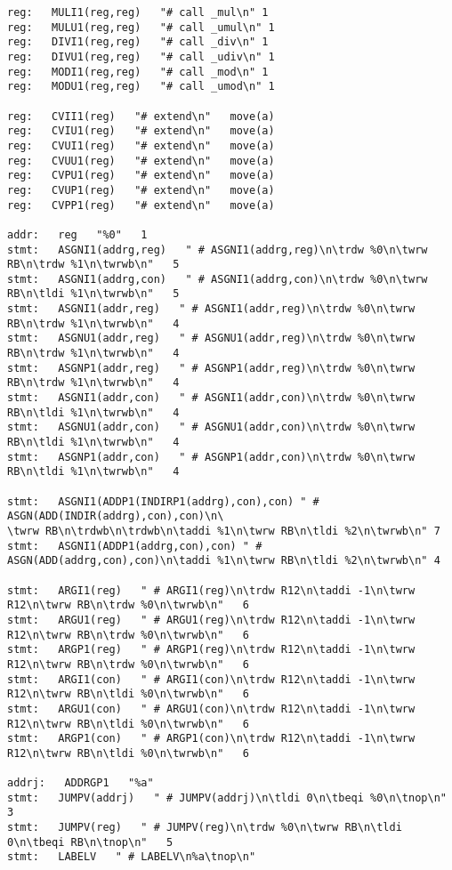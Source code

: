 {\begin{verbatim}
reg:   MULI1(reg,reg)   "# call _mul\n" 1
reg:   MULU1(reg,reg)   "# call _umul\n" 1
reg:   DIVI1(reg,reg)   "# call _div\n" 1
reg:   DIVU1(reg,reg)   "# call _udiv\n" 1
reg:   MODI1(reg,reg)   "# call _mod\n" 1
reg:   MODU1(reg,reg)   "# call _umod\n" 1

reg:   CVII1(reg)   "# extend\n"   move(a)
reg:   CVIU1(reg)   "# extend\n"   move(a)
reg:   CVUI1(reg)   "# extend\n"   move(a)
reg:   CVUU1(reg)   "# extend\n"   move(a)
reg:   CVPU1(reg)   "# extend\n"   move(a)
reg:   CVUP1(reg)   "# extend\n"   move(a)
reg:   CVPP1(reg)   "# extend\n"   move(a)

addr:   reg   "%0"   1
stmt:   ASGNI1(addrg,reg)   " # ASGNI1(addrg,reg)\n\trdw %0\n\twrw RB\n\trdw %1\n\twrwb\n"   5
stmt:   ASGNI1(addrg,con)   " # ASGNI1(addrg,con)\n\trdw %0\n\twrw RB\n\tldi %1\n\twrwb\n"   5
stmt:   ASGNI1(addr,reg)   " # ASGNI1(addr,reg)\n\trdw %0\n\twrw RB\n\trdw %1\n\twrwb\n"   4
stmt:   ASGNU1(addr,reg)   " # ASGNU1(addr,reg)\n\trdw %0\n\twrw RB\n\trdw %1\n\twrwb\n"   4
stmt:   ASGNP1(addr,reg)   " # ASGNP1(addr,reg)\n\trdw %0\n\twrw RB\n\trdw %1\n\twrwb\n"   4
stmt:   ASGNI1(addr,con)   " # ASGNI1(addr,con)\n\trdw %0\n\twrw RB\n\tldi %1\n\twrwb\n"   4
stmt:   ASGNU1(addr,con)   " # ASGNU1(addr,con)\n\trdw %0\n\twrw RB\n\tldi %1\n\twrwb\n"   4
stmt:   ASGNP1(addr,con)   " # ASGNP1(addr,con)\n\trdw %0\n\twrw RB\n\tldi %1\n\twrwb\n"   4

stmt:   ASGNI1(ADDP1(INDIRP1(addrg),con),con) " # ASGN(ADD(INDIR(addrg),con),con)\n\
\twrw RB\n\trdwb\n\trdwb\n\taddi %1\n\twrw RB\n\tldi %2\n\twrwb\n" 7
stmt:   ASGNI1(ADDP1(addrg,con),con) " # ASGN(ADD(addrg,con),con)\n\taddi %1\n\twrw RB\n\tldi %2\n\twrwb\n" 4

stmt:   ARGI1(reg)   " # ARGI1(reg)\n\trdw R12\n\taddi -1\n\twrw R12\n\twrw RB\n\trdw %0\n\twrwb\n"   6
stmt:   ARGU1(reg)   " # ARGU1(reg)\n\trdw R12\n\taddi -1\n\twrw R12\n\twrw RB\n\trdw %0\n\twrwb\n"   6
stmt:   ARGP1(reg)   " # ARGP1(reg)\n\trdw R12\n\taddi -1\n\twrw R12\n\twrw RB\n\trdw %0\n\twrwb\n"   6
stmt:   ARGI1(con)   " # ARGI1(con)\n\trdw R12\n\taddi -1\n\twrw R12\n\twrw RB\n\tldi %0\n\twrwb\n"   6
stmt:   ARGU1(con)   " # ARGU1(con)\n\trdw R12\n\taddi -1\n\twrw R12\n\twrw RB\n\tldi %0\n\twrwb\n"   6
stmt:   ARGP1(con)   " # ARGP1(con)\n\trdw R12\n\taddi -1\n\twrw R12\n\twrw RB\n\tldi %0\n\twrwb\n"   6

addrj:   ADDRGP1   "%a"
stmt:   JUMPV(addrj)   " # JUMPV(addrj)\n\tldi 0\n\tbeqi %0\n\tnop\n"   3
stmt:   JUMPV(reg)   " # JUMPV(reg)\n\trdw %0\n\twrw RB\n\tldi 0\n\tbeqi RB\n\tnop\n"   5
stmt:   LABELV   " # LABELV\n%a\tnop\n"


\end{verbatim}}
